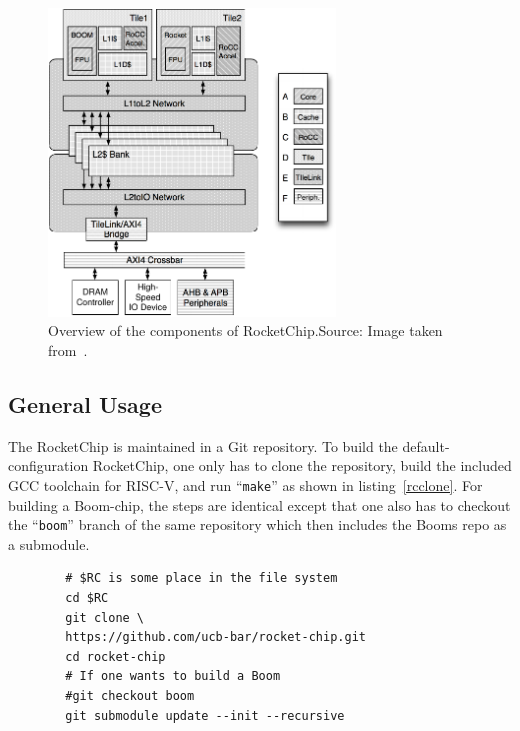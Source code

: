 \documentclass[journal,a4paper]{IEEEtran}
\newcommand{\source}[1]{Source: #1}
\begin{document}
\begin{figure}[!t]
	\centering
	\includegraphics[width=3in]{rcov}
	\caption{Overview of the components of RocketChip.\newline\hspace{\linewidth}\source{Image taken from~\cite{rcgen}}.}
	\label{rcov}
\end{figure}

\subsection{General Usage}
The RocketChip is maintained in a Git repository.
To build the default-configuration RocketChip, one only has to clone the repository, build the included GCC toolchain for RISC-V, and run ``\texttt{make}'' as shown in listing~\ref{rcclone}. For building a Boom-chip, the steps are identical except that one also has to checkout the ``\texttt{boom}'' branch of the same repository which then includes the Booms repo as a submodule.


\begin{table}
	\caption{Downloading and initialising the Rocket chip repository.\newline\hspace{\linewidth}Source: Collected from~\cite{rc_github} and~\cite{boom_github}.}
	\label{rcclone}
	\begin{verbatim}
		# $RC is some place in the file system
		cd $RC
		git clone \
		https://github.com/ucb-bar/rocket-chip.git
		cd rocket-chip
		# If one wants to build a Boom
		#git checkout boom
		git submodule update --init --recursive
	\end{verbatim}
\end{table}
\end{document}
